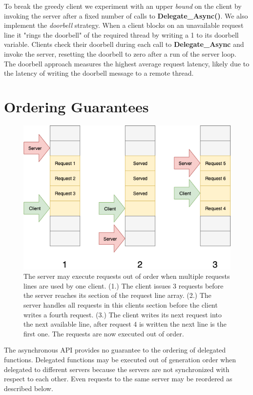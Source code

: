 \documentclass{uicthesi}
\begin{document}
To break the greedy client we experiment with an upper \textit{bound} on the client by invoking the server after a fixed number of calls to \textbf{Delegate\_Async()}. We also implement the \textit{doorbell} strategy. When a client blocks on an unavailable request line it "rings the doorbell" of the required thread by writing a 1 to its doorbell variable. Clients check their doorbell during each call to \textbf{Delegate\_Async} and invoke the server, resetting the doorbell to zero after a run of the server loop. The doorbell approach measures the highest average request latency, likely due to the latency of writing the doorbell message to a remote thread. 

\section{Ordering Guarantees}
\begin{figure}[ht!]
\centering
\includegraphics[width=0.9\columnwidth]{FIG/multiple_rl_race.png}
\caption{The server may execute requests out of order when multiple requests lines are used by one client. (1.) The client issues 3 requests before the server reaches its section of the request line array. (2.) The server handles all requests in this clients section before the client writes a fourth request. (3.) The client writes its next request into the next available line, after request 4 is written the next line is the first one. The requests are now executed out of order.}
\label{fig:multiple_rl_race}
\end{figure}
The asynchronous API provides no guarantee to the ordering of delegated functions. Delegated functions may be executed out of generation order when delegated to different servers because the servers are not synchronized with respect to each other. Even requests to the same server may be reordered as described below.  
\end{document}
